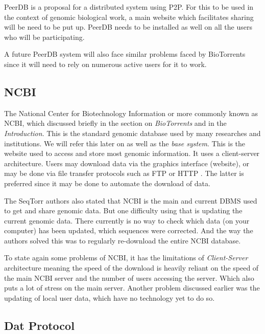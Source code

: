\documentclass[acmsmall]{acmart}
\begin{document}
PeerDB is a proposal for a distributed system using P2P. For this to be used in the context of genomic biological work, a main website which facilitates sharing will be need to be put up. PeerDB needs to be installed as well on all the users who will be participating.

A future PeerDB system will also face similar problems faced by BioTorrents since it will need to rely on numerous active users for it to work.

\subsection{NCBI} \label{NCBI}
The National Center for Biotechnology Information or more commonly known as NCBI, which discussed briefly in the section on \textit{BioTorrents} and in the \textit{Introduction}. This is the standard genomic database used by many researches and institutions. We will refer this later on as well as the \textit{base system}. This is the website used to access and store most genomic information\cite{campbell}. It uses a client-server architecture. Users may download data via the graphics interface (website), or may be done via file transfer protocols such as FTP or HTTP \cite{biotorrents}. The latter is preferred since it may be done to automate the download of data.

The SeqTorr authors\cite{seqtorr} also stated that NCBI is the main and current DBMS used to get and share genomic data. But one difficulty using that is updating the current genomic data. There currently is no way to check which data (on your computer) has been updated, which sequences were corrected. And the way the authors solved this was to regularly re-download the entire NCBI database.

To state again some problems of NCBI, it has the limitations of \textit{Client-Server} architecture meaning the speed of the download is heavily reliant on the speed of the main NCBI server and the number of users accessing the server. Which also puts a lot of stress on the main server. Another problem discussed earlier was the updating of local user data, which have no technology yet to do so.


\subsection{Dat Protocol}
\end{document}
